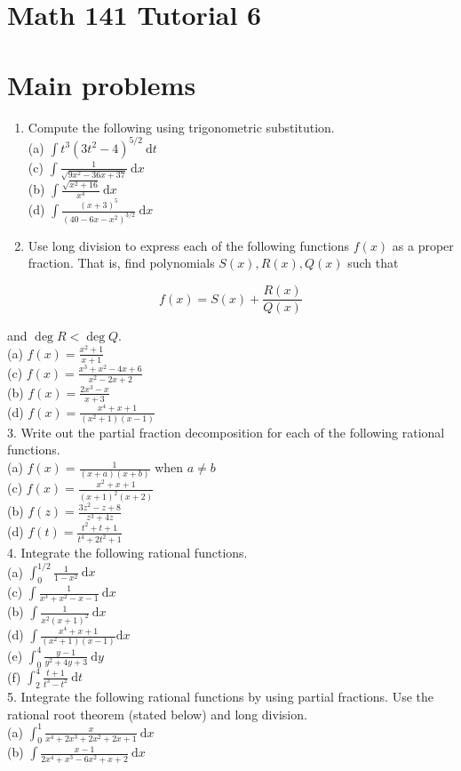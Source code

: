 \documentclass[10pt]{article}
\begin{document}
\section*{Math 141 Tutorial 6}
\section*{Main problems}
\begin{enumerate}
  \item Compute the following using trigonometric substitution.\\
(a) $\int t^{3}\left(3 t^{2}-4\right)^{5 / 2} \mathrm{~d} t$\\
(c) $\int \frac{1}{\sqrt{9 x^{2}-36 x+37}} \mathrm{~d} x$\\
(b) $\int \frac{\sqrt{x^{2}+16}}{x^{4}} \mathrm{~d} x$\\
(d) $\int \frac{(x+3)^{5}}{\left(40-6 x-x^{2}\right)^{3 / 2}} \mathrm{~d} x$
  \item Use long division to express each of the following functions $f(x)$ as a proper fraction. That is, find polynomials $S(x), R(x), Q(x)$ such that
\end{enumerate}

$$
f(x)=S(x)+\frac{R(x)}{Q(x)}
$$

and $\operatorname{deg} R<\operatorname{deg} Q$.\\
(a) $f(x)=\frac{x^{2}+1}{x+1}$\\
(c) $f(x)=\frac{x^{3}+x^{2}-4 x+6}{x^{2}-2 x+2}$\\
(b) $f(x)=\frac{2 x^{3}-x}{x+3}$\\
(d) $f(x)=\frac{x^{4}+x+1}{\left(x^{2}+1\right)(x-1)}$\\
3. Write out the partial fraction decomposition for each of the following rational functions.\\
(a) $f(x)=\frac{1}{(x+a)(x+b)}$ when $a \neq b$\\
(c) $f(x)=\frac{x^{2}+x+1}{(x+1)^{2}(x+2)}$\\
(b) $f(z)=\frac{3 z^{2}-z+8}{z^{3}+4 z}$\\
(d) $f(t)=\frac{t^{2}+t+1}{t^{4}+2 t^{2}+1}$\\
4. Integrate the following rational functions.\\
(a) $\int_{0}^{1 / 2} \frac{1}{1-x^{2}} \mathrm{~d} x$\\
(c) $\int \frac{1}{x^{3}+x^{2}-x-1} \mathrm{~d} x$\\
(b) $\int \frac{1}{x^{2}(x+1)^{2}} \mathrm{~d} x$\\
(d) $\int \frac{x^{4}+x+1}{\left(x^{2}+1\right)(x-1)} \mathrm{d} x$\\
(e) $\int_{0}^{4} \frac{y-1}{y^{2}+4 y+3} \mathrm{~d} y$\\
(f) $\int_{2}^{4} \frac{t+1}{t^{3}-t^{2}} \mathrm{~d} t$\\
5. Integrate the following rational functions by using partial fractions. Use the rational root theorem (stated below) and long division.\\
(a) $\int_{0}^{1} \frac{x}{x^{4}+2 x^{3}+2 x^{2}+2 x+1} \mathrm{~d} x$\\
(b) $\int \frac{x-1}{2 x^{4}+x^{3}-6 x^{2}+x+2} \mathrm{~d} x$
\end{document}
